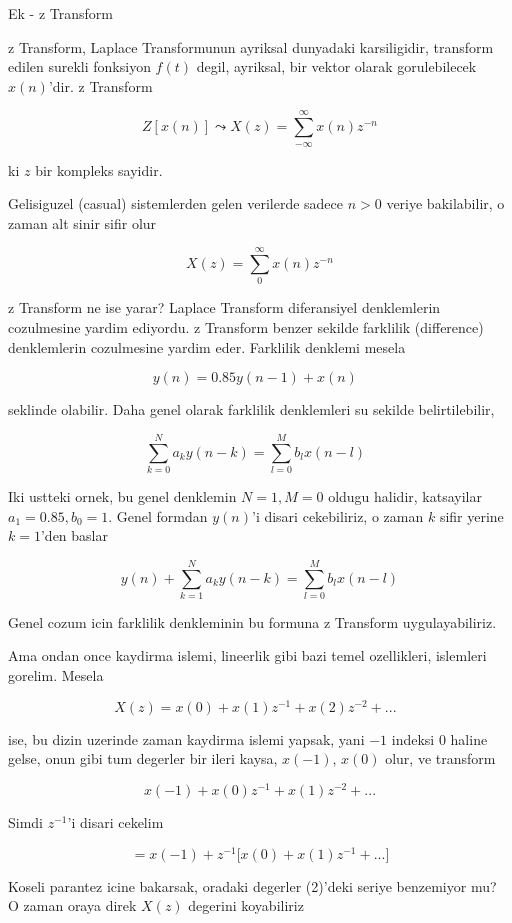 \documentclass[12pt,fleqn]{article}\usepackage{../common}
\begin{document}
Ek - z Transform 

z Transform, Laplace Transformunun ayriksal dunyadaki karsiligidir,
transform edilen surekli fonksiyon $f(t)$ degil, ayriksal, bir vektor
olarak gorulebilecek $x(n)$'dir. z Transform

$$ Z[x(n)] \leadsto X(z) = \sum_{-\infty}^{\infty} x(n)z^{-n}  $$

ki $z$ bir kompleks sayidir. 

Gelisiguzel (casual) sistemlerden gelen verilerde sadece $n>0$ veriye
bakilabilir, o zaman alt sinir sifir olur

$$ X(z) = \sum_{0}^{\infty} x(n)z^{-n}  $$

z Transform ne ise yarar? Laplace Transform diferansiyel denklemlerin
cozulmesine yardim ediyordu. z Transform benzer sekilde farklilik
(difference) denklemlerin cozulmesine yardim eder. Farklilik denklemi
mesela

$$ y(n) = 0.85 y(n-1) + x(n) 
\ \ \ \label{3}
$$

seklinde olabilir. Daha genel olarak farklilik denklemleri su sekilde
belirtilebilir,

$$ \sum_{k=0}^N a_k y(n-k) = \sum_{l=0}^M b_l x(n-l) 
\ \ \ \label{1}
$$

Iki ustteki ornek, bu genel denklemin $N=1,M=0$ oldugu halidir, katsayilar
$a_1 = 0.85,b_0=1$. Genel formdan $y(n)$'i disari cekebiliriz, o zaman
$k$ sifir yerine $k=1$'den baslar

$$ y(n) + \sum_{k=1}^N a_k y(n-k) = \sum_{l=0}^M b_l x(n-l) $$

Genel cozum icin farklilik denkleminin bu formuna z Transform
uygulayabiliriz. 

Ama ondan once kaydirma islemi, lineerlik gibi bazi temel ozellikleri,
islemleri gorelim. Mesela

$$ X(z) = x(0) + x(1)z^{-1} + x(2) z^{-2} + ... 
\ \ \ \label{2}
$$

ise, bu dizin uzerinde zaman kaydirma islemi yapsak, yani $-1$ indeksi
$0$ haline gelse, onun gibi tum degerler bir ileri kaysa, $x(-1)$,
$x(0)$ olur, ve transform

$$ x(-1) + x(0)z^{-1} + x(1) z^{-2} + ...$$

Simdi $z^{-1}$'i disari cekelim

$$ = x(-1) + z^{-1} \bigg[ x(0) + x(1) z^{-1} + ... \bigg] $$

Koseli parantez icine bakarsak, oradaki degerler (2)'deki seriye benzemiyor
mu? O zaman oraya direk $X(z)$ degerini koyabiliriz
\end{document}

